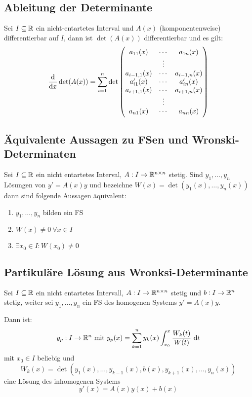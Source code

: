 \subsection{Ableitung der Determinante}
Sei $I \subseteq \mathbb{R}$ ein nicht-entartetes Interval und $A(x)$ (komponentenweise) differentierbar auf
$I$, dann ist $\det(A(x))$ differentierbar und es gilt:
\begin{equation*}
	\dfrac{\text{d}}{\text{d}x} \det(A(x)) = \sum_{i=1}^n \det \begin{pmatrix}
		a_{11}(x) & \cdots & a_{1n}(x)\\
		& \vdots \\
		a_{i-1,1}(x) & \cdots & a_{i-1,n}(x)\\
		a'_{i1}(x) & \cdots & a'_{in}(x)\\
		a_{i+1,1}(x) & \cdots & a_{i+1,n}(x)\\
		& \vdots \\
		a_{n1}(x) & \cdots & a_{nn}(x)\\
	\end{pmatrix}
\end{equation*}


\subsection{Äquivalente Aussagen zu FSen und Wronski-Determinaten}
Sei $I \subseteq \mathbb{R}$ ein nicht entartetes Interval, $A: I \to \mathbb{R}^{n \times n}$ stetig.
Sind $y_1, \ldots, y_n$ Lösungen von $y' = A(x)  y$ und bezeichne $W(x) = \det(y_1(x), \ldots, y_n(x))$
dann sind folgende Aussagen äquivalent:
\begin{enumerate}[label= (\alph*)]
	\item $y_1, \ldots, y_n$ bilden ein FS
	\item $W(x) \neq 0\ \forall x \in I$
	\item $\exists x_0 \in I: W(x_0) \neq 0$
\end{enumerate}		

\subsection{Partikuläre Lösung aus Wronksi-Determinante}
Sei $I \subseteq \mathbb{R}$ ein nicht entartetes Intervall, $A: I \to \mathbb{R}^{n \times n}$ stetig und $b: I \to \mathbb{R}^n$
stetig, weiter sei $y_1, \ldots, y_n$ ein FS des homogenen Systems $y' = A(x) y$.

Dann ist:
\begin{equation*}
	y_p: I \to \mathbb{R}^n \text{ mit } y_p(x) = \sum_{k=1}^n y_k(x) \int_{x_0}^x \frac{W_k(t)}{W(t)} \text{ d}t
\end{equation*}
mit $x_0 \in I$ beliebig und 
\begin{equation*}
	W_k(x) = \det(y_1(x), \ldots, y_{k-1}(x), b(x), y_{k+1}(x), \ldots, y_n(x))
\end{equation*}
eine Lösung des inhomogenen Systems
\begin{equation*}
	y'(x) = A(x) y(x) + b(x)
\end{equation*}

